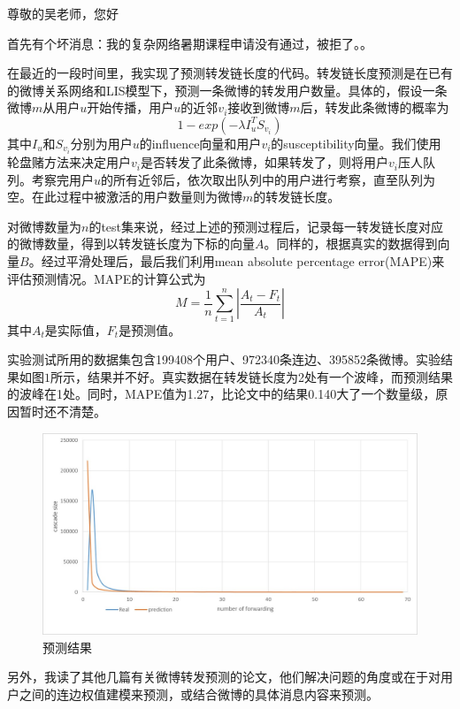 \documentclass[UTF8]{ctexart}
\begin{document}
\par 尊敬的吴老师，您好
\newline 
\par 首先有个坏消息：我的复杂网络暑期课程申请没有通过，被拒了。。
\newline 
\par
在最近的一段时间里，我实现了预测转发链长度的代码。转发链长度预测是在已有的微博关系网络和LIS模型下，预测一条微博的转发用户数量。具体的，假设一条微博$m$从用户$u$开始传播，用户$u$的近邻$v_{i}$接收到微博$m$后，转发此条微博的概率为
\begin{equation}
1-exp(- \lambda I_{u}^{T}S_{v_{i}})
\end{equation}
其中$I_{u}$和$S_{v_{i}}$分别为用户$u$的influence向量和用户$v_{i}$的susceptibility向量。我们使用轮盘赌方法来决定用户$v_{i}$是否转发了此条微博，如果转发了，则将用户$v_{i}$压人队列。考察完用户$u$的所有近邻后，依次取出队列中的用户进行考察，直至队列为空。在此过程中被激活的用户数量则为微博$m$的转发链长度。
\par 对微博数量为$n$的test集来说，经过上述的预测过程后，记录每一转发链长度对应的微博数量，得到以转发链长度为下标的向量$A$。同样的，根据真实的数据得到向量$B$。经过平滑处理后，最后我们利用mean absolute percentage error(MAPE)来评估预测情况。MAPE的计算公式为
\begin{equation}
M = \frac{1}{n}\sum_{t=1}^{n}\left | \frac{A_{t}-F_{t} }{A_{t}}\right |
\end{equation}
其中$A_{t}$是实际值，$F_{t}$是预测值。
\par 实验测试所用的数据集包含199408个用户、972340条连边、395852条微博。实验结果如图$1$所示，结果并不好。真实数据在转发链长度为2处有一个波峰，而预测结果的波峰在1处。同时，MAPE值为1.27，比论文中的结果0.140大了一个数量级，原因暂时还不清楚。
\begin{figure}[h!]
    \centering
    \includegraphics[width=12cm]{cascade.jpg}
    \caption{预测结果}
    \label{fig-sample}
\end{figure}
\par 另外，我读了其他几篇有关微博转发预测的论文，他们解决问题的角度或在于对用户之间的连边权值建模来预测，或结合微博的具体消息内容来预测。
\newline
\par {}
\end{document}
